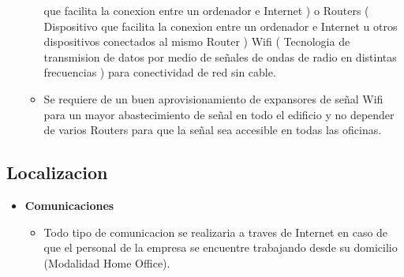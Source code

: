 \documentclass[
10pt, %
a4paper, %
oneside, %
headinclude,footinclude, %
BCOR5mm, %
]{scrartcl}
\begin{document}
\begin{itemize}
\begin{itemize}
            que facilita la conexion entre un ordenador e Internet ) o
            Routers ( Dispositivo que facilita la conexion entre un
            ordenador e Internet u otros dispositivos conectados al mismo
            Router ) Wifi ( Tecnologia de transmision de datos por medio de
            señales de ondas de radio en distintas frecuencias ) para
            conectividad de red sin cable.
    \item Se requiere de un buen aprovisionamiento de expansores de señal Wifi
            para un mayor abastecimiento de señal en todo el edificio y
            no depender de varios Routers para que la señal sea accesible en
            todas las oficinas.
  \end{itemize}
\end{itemize}

\subsection{Localizacion}
\begin{itemize}
  \item \textbf {Comunicaciones}
  \begin{itemize}
    \item Todo tipo de comunicacion se realizaria a traves de Internet en caso
            de que el personal de la empresa se encuentre trabajando desde su
            domicilio (Modalidad Home Office).
  \end{itemize}
\end{itemize}
\end{document}
